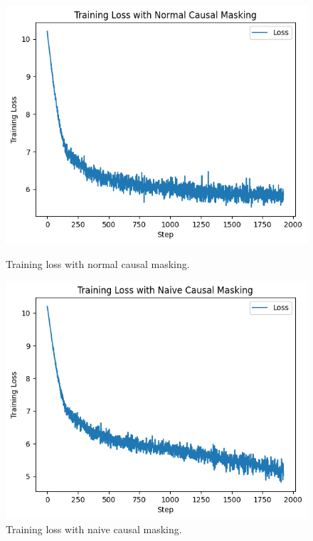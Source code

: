 \documentclass{article}
\begin{document}
\begin{figure}[htbp]
    \centering
    \begin{minipage}[b]{0.45\textwidth}
        \centering
        \includegraphics[width=\textwidth]{plots/traininglossnormal.png}
        \caption{Training loss with normal causal masking.}
        \label{fig:traininglossnormal}
    \end{minipage}
    \hfill
    \begin{minipage}[b]{0.45\textwidth}
        \centering
        \includegraphics[width=\textwidth]{plots/traininglossnaive.png}
        \caption{Training loss with naive causal masking.}
        \label{fig:traininglossnaive}
    \end{minipage}
\end{figure}
\end{document}
